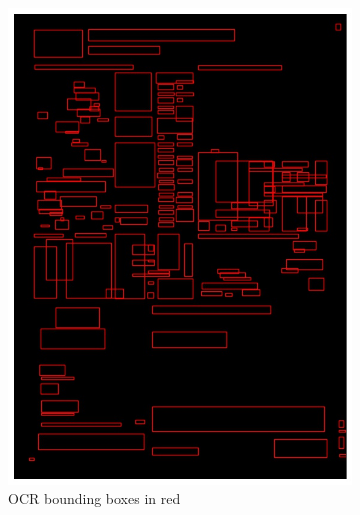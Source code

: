 \documentclass[oneside, english, bibtex]{kththesis}
\begin{document}
\begin{figure}[!htb]
\begin{adjustbox}{center,max size={\textwidth}{0.9\textheight}}
\parbox{1.5\textwidth}{\lineskip=0pt
\begin{subfigure}{0.6\textwidth}
  \centering
  \includegraphics[width=\linewidth, clip=true, trim = 0mm 0mm 0mm 0mm]{figures/ocr/Jd55Bvg.jpg}
  \caption{OCR bounding boxes in red}
  \label{fig:Jd55Bvg_OCR}
\end{subfigure}%
\begin{subfigure}{0.6\textwidth}
  \centering

\end{subfigure}}
\end{adjustbox}
\end{figure}
\end{document}
